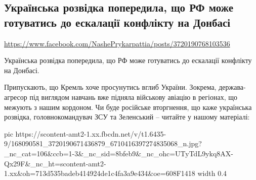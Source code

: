  
 
 
 
 

\subsection{Українська розвідка попередила, що РФ може готуватись до ескалації конфлікту на Донбасі}
\url{https://www.facebook.com/NashePrykarpattia/posts/3720190768103536}

Українська розвідка попередила, що РФ може готуватись до ескалації конфлікту на
Донбасі.  

Припускають, що Кремль хоче просунутись вглиб України. Зокрема, держава-агресор
під виглядом навчань вже підняла військову авіацію в регіонах, що межують з
нашим кордоном.  Чи буде російське вторгнення, що каже українська розвідка,
головнокомандувач ЗСУ та Зеленський – читайте у нашому матеріалі:


\ifcmt
  pic https://scontent-amt2-1.xx.fbcdn.net/v/t1.6435-9/168090581_3720190671436879_6710416397274835068_n.jpg?_nc_cat=106&ccb=1-3&_nc_sid=8bfeb9&_nc_ohc=UTyTdL9ykq8AX-Qx29F&_nc_ht=scontent-amt2-1.xx&oh=713d535badeb414924de1c4fa3a9e434&oe=608F1418
  width 0.4
\fi

